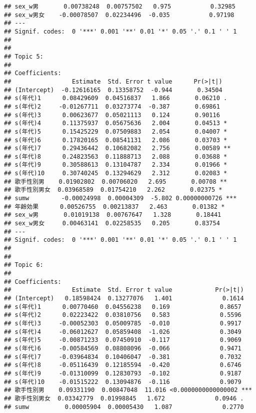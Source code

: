 \documentclass[
]{article}
\begin{document}
\begin{verbatim}
## sex_w男       0.00738248  0.00757502   0.975           0.32985    
## sex_w男女    -0.00078507  0.02234496  -0.035           0.97198    
## ---
## Signif. codes:  0 '***' 0.001 '**' 0.01 '*' 0.05 '.' 0.1 ' ' 1
## 
## 
## Topic 5:
## 
## Coefficients:
##                 Estimate  Std. Error t value      Pr(>|t|)    
## (Intercept)  -0.12616165  0.13358752  -0.944       0.34504    
## s(年代)1      0.08429609  0.04516837   1.866       0.06210 .  
## s(年代)2     -0.01267711  0.03273774  -0.387       0.69861    
## s(年代)3      0.00623677  0.05021113   0.124       0.90116    
## s(年代)4      0.11375937  0.05675636   2.004       0.04513 *  
## s(年代)5      0.15425229  0.07509883   2.054       0.04007 *  
## s(年代)6      0.17820165  0.08541131   2.086       0.03703 *  
## s(年代)7      0.29436442  0.10682082   2.756       0.00589 ** 
## s(年代)8      0.24823563  0.11888713   2.088       0.03688 *  
## s(年代)9      0.30588613  0.13104787   2.334       0.01966 *  
## s(年代)10     0.30740245  0.13294629   2.312       0.02083 *  
## 歌手性別男    0.01902802  0.00706020   2.695       0.00708 ** 
## 歌手性別男女  0.03968589  0.01754210   2.262       0.02375 *  
## sumw         -0.00024998  0.00004309  -5.802 0.00000000726 ***
## 年齢効果      0.00526755  0.00213837   2.463       0.01382 *  
## sex_w男       0.01019138  0.00767647   1.328       0.18441    
## sex_w男女     0.00463141  0.02258535   0.205       0.83754    
## ---
## Signif. codes:  0 '***' 0.001 '**' 0.01 '*' 0.05 '.' 0.1 ' ' 1
## 
## 
## Topic 6:
## 
## Coefficients:
##                 Estimate  Std. Error t value            Pr(>|t|)    
## (Intercept)   0.18598424  0.13277076   1.401              0.1614    
## s(年代)1      0.00770460  0.04556238   0.169              0.8657    
## s(年代)2      0.02223422  0.03810756   0.583              0.5596    
## s(年代)3     -0.00052303  0.05009785  -0.010              0.9917    
## s(年代)4     -0.06012627  0.05859408  -1.026              0.3049    
## s(年代)5     -0.00871233  0.07450910  -0.117              0.9069    
## s(年代)6     -0.00584569  0.08808096  -0.066              0.9471    
## s(年代)7     -0.03964834  0.10406047  -0.381              0.7032    
## s(年代)8     -0.05116439  0.12185594  -0.420              0.6746    
## s(年代)9     -0.01310099  0.12830793  -0.102              0.9187    
## s(年代)10    -0.01515222  0.13094876  -0.116              0.9079    
## 歌手性別男    0.09331190  0.00847048  11.016 <0.0000000000000002 ***
## 歌手性別男女  0.03342779  0.01998845   1.672              0.0946 .  
## sumw          0.00005904  0.00005430   1.087              0.2770    

\end{verbatim}
\end{document}
